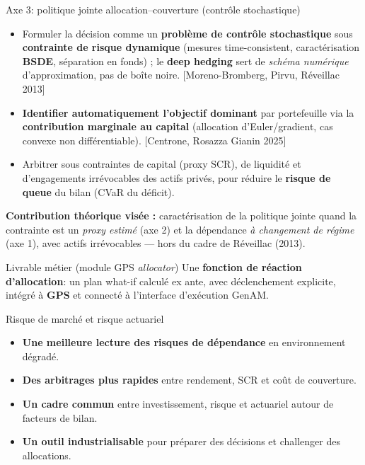 \documentclass[aspectratio=169,11pt]{beamer}
\newcommand{\highlight}[1]{\textcolor{GeneraliRed}{\textbf{#1}}}
\newcommand{\source}[1]{{\scriptsize\textcolor{Slate!65}{[#1]}}}
\begin{document}
\begin{frame}[shrink=10]{Axe 3: politique jointe allocation–couverture (contrôle stochastique)}
  \begin{itemize}
    \item Formuler la décision comme un \highlight{problème de contrôle stochastique} sous \highlight{contrainte de risque dynamique} (mesures time-consistent, caractérisation \highlight{BSDE}, séparation en fonds) ; le \highlight{deep hedging} sert de \emph{schéma numérique} d'approximation, pas de boîte noire. \source{Moreno-Bromberg, Pirvu, Réveillac 2013}
    \item \highlight{Identifier automatiquement l'objectif dominant} par portefeuille via la \highlight{contribution marginale au capital} (allocation d'Euler/gradient, cas convexe non différentiable). \source{Centrone, Rosazza Gianin 2025}
    \item Arbitrer sous contraintes de capital (proxy SCR), de liquidité et d'engagements irrévocables des actifs privés, pour réduire le \highlight{risque de queue} du bilan (CVaR du déficit).
  \end{itemize}

  {\footnotesize \highlight{Contribution théorique visée :} caractérisation de la politique jointe quand la contrainte est un \emph{proxy estimé} (axe 2) et la dépendance \emph{à changement de régime} (axe 1), avec actifs irrévocables — hors du cadre de Réveillac (2013).}

  \begin{block}{Livrable métier (module GPS \textemdash{} \textit{allocator})}
    Une \highlight{fonction de réaction d'allocation}: un plan what-if calculé ex ante, avec déclenchement explicite, intégré à \highlight{GPS} et connecté à l'interface d'exécution GenAM.
  \end{block}
\end{frame}

\begin{frame}{Risque de marché et risque actuariel}
  \begin{itemize}
    \item \highlight{Une meilleure lecture des risques de dépendance} en environnement dégradé.
    \item \highlight{Des arbitrages plus rapides} entre rendement, SCR et coût de couverture.
    \item \highlight{Un cadre commun} entre investissement, risque et actuariel autour de facteurs de bilan.
    \item \highlight{Un outil industrialisable} pour préparer des décisions et challenger des allocations.
  \end{itemize}
\end{frame}
\end{document}
